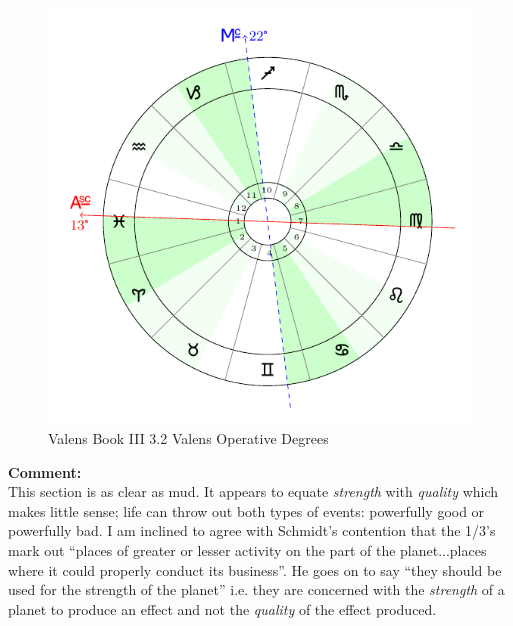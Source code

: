 \begin{figure}[H]
\includegraphics[width=\textwidth]{charts/3_02_Valens_opdegs}
\caption{Valens Book III 3.2 Valens Operative Degrees}
\end{figure}

\begin{mdframed}[backgroundcolor=cyan!5]
\textbf{Comment:} \hfill \\
This section is as clear as mud. It appears to equate \textsl{strength} with \textsl{quality} which makes little sense; life can throw out both types of events: powerfully good or powerfully bad. I am inclined to agree with Schmidt's contention that the 1/3's mark out ``places of greater or lesser activity on the part of the planet...places where it could properly conduct its business''. He goes on to say ``they should be used for the strength of the planet'' i.e. they are concerned with the \textsl{strength} of a planet to produce an effect and not the \textsl{quality} of the effect produced.
\end{mdframed}

\newpage